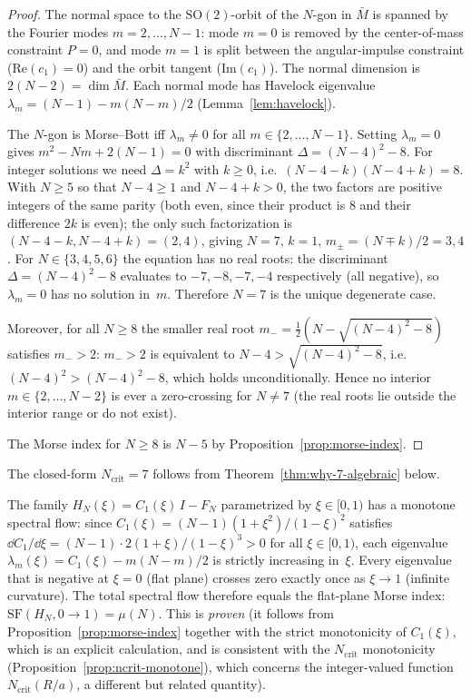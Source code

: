 \begin{proof}
The normal space to the $\mathrm{SO}(2)$-orbit of the $N$-gon
in $\bar{M}$ is spanned by the Fourier modes
$m = 2, \ldots, N{-}1$: mode $m = 0$ is removed by the
center-of-mass constraint $P = 0$, and mode $m = 1$ is split
between the angular-impulse constraint ($\mathrm{Re}(c_1) = 0$)
and the orbit tangent ($\mathrm{Im}(c_1)$).
The normal dimension is $2(N{-}2) = \dim\bar{M}$.
Each normal mode has Havelock eigenvalue
$\lambda_m = (N{-}1) - m(N{-}m)/2$
(Lemma~\ref{lem:havelock}).

The $N$-gon is Morse--Bott iff $\lambda_m \ne 0$ for all
$m \in \{2, \ldots, N{-}1\}$.
Setting $\lambda_m = 0$ gives $m^2 - Nm + 2(N{-}1) = 0$
with discriminant $\Delta = (N{-}4)^2 - 8$.
For integer solutions we need $\Delta = k^2$ with $k \ge 0$,
i.e.\ $(N{-}4{-}k)(N{-}4{+}k) = 8$.
With $N \ge 5$ so that $N-4 \ge 1$ and $N-4+k > 0$,
the two factors are positive integers of the same parity
(both even, since their product is $8$ and their difference
$2k$ is even); the only such factorization is
$(N{-}4{-}k, N{-}4{+}k) = (2, 4)$,
giving $N = 7$, $k = 1$, $m_\pm = (N \mp k)/2 = 3, 4$.
For $N \in \{3, 4, 5, 6\}$ the equation has no real
roots: the discriminant $\Delta = (N-4)^2 - 8$ evaluates
to $-7, -8, -7, -4$ respectively (all negative), so
$\lambda_m = 0$ has no solution in~$m$.
Therefore $N = 7$ is the unique degenerate case.

Moreover, for all $N \ge 8$ the smaller real root
$m_- = \tfrac12(N - \sqrt{(N{-}4)^2 - 8})$ satisfies $m_- > 2$:
$m_- > 2$ is equivalent to $N - 4 > \sqrt{(N{-}4)^2 - 8}$,
i.e.\ $(N{-}4)^2 > (N{-}4)^2 - 8$, which holds unconditionally.
Hence no interior $m \in \{2,\ldots,N{-}2\}$ is ever a zero-crossing
for $N \ne 7$ (the real roots lie outside the interior range
or do not exist).

The Morse index for $N \ge 8$ is $N{-}5$ by
Proposition~\ref{prop:morse-index}.
\end{proof}

The closed-form $N_{\mathrm{crit}} = 7$ follows from
Theorem~\ref{thm:why-7-algebraic} below.

The family $H_N(\xi) = C_1(\xi)\,I - F_N$ parametrized by
$\xi \in [0, 1)$ has a monotone spectral flow: since
$C_1(\xi) = (N{-}1)(1{+}\xi^2)/(1{-}\xi)^2$ satisfies
$\dd C_1/\dd\xi = (N{-}1)\cdot 2(1{+}\xi)/(1{-}\xi)^3 > 0$
for all $\xi \in [0,1)$, each eigenvalue
$\lambda_m(\xi) = C_1(\xi) - m(N{-}m)/2$ is strictly increasing
in~$\xi$.  Every eigenvalue that is negative at $\xi = 0$
(flat plane) crosses zero exactly once as $\xi \to 1$ (infinite
curvature).  The total spectral flow therefore equals the
flat-plane Morse index:
$\mathrm{SF}(H_N, 0 \to 1) = \mu(N)$.  This is \emph{proven}
(it follows from Proposition~\ref{prop:morse-index} together with
the strict monotonicity of $C_1(\xi)$, which is an explicit
calculation, and is consistent with the
$N_{\mathrm{crit}}$ monotonicity
(Proposition~\ref{prop:ncrit-monotone}), which concerns the
integer-valued function $N_{\mathrm{crit}}(R/a)$, a different
but related quantity).

